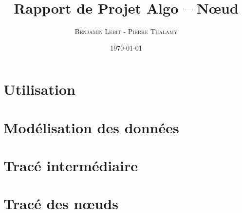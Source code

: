 \documentclass{article}
\title{Rapport de Projet Algo -- Nœud}
\author{\textsc{Benjamin Lebit} - \textsc{Pierre Thalamy}}
\date{\today}
\begin{document}
\maketitle

\section {Utilisation}

\section {Modélisation des données}

\section {Tracé intermédiaire}

\section {Tracé des nœuds}
\end{document}
